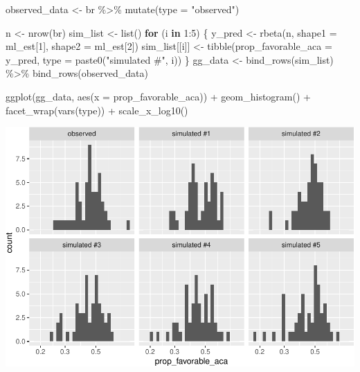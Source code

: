 \documentclass[
]{book}
\newenvironment{Shaded}{\begin{snugshade}}{\end{snugshade}}
\newcommand{\AttributeTok}[1]{\textcolor[rgb]{0.77,0.63,0.00}{#1}}
\newcommand{\ControlFlowTok}[1]{\textcolor[rgb]{0.13,0.29,0.53}{\textbf{#1}}}
\newcommand{\DecValTok}[1]{\textcolor[rgb]{0.00,0.00,0.81}{#1}}
\newcommand{\FunctionTok}[1]{\textcolor[rgb]{0.00,0.00,0.00}{#1}}
\newcommand{\NormalTok}[1]{#1}
\newcommand{\OtherTok}[1]{\textcolor[rgb]{0.56,0.35,0.01}{#1}}
\newcommand{\SpecialCharTok}[1]{\textcolor[rgb]{0.00,0.00,0.00}{#1}}
\newcommand{\StringTok}[1]{\textcolor[rgb]{0.31,0.60,0.02}{#1}}
\begin{document}
\begin{Shaded}
\begin{Highlighting}[]
\NormalTok{observed\_data }\OtherTok{\textless{}{-}}\NormalTok{ br }\SpecialCharTok{\%\textgreater{}\%}
  \FunctionTok{mutate}\NormalTok{(}\AttributeTok{type =} \StringTok{"observed"}\NormalTok{)}

\NormalTok{n }\OtherTok{\textless{}{-}} \FunctionTok{nrow}\NormalTok{(br)}
\NormalTok{sim\_list }\OtherTok{\textless{}{-}} \FunctionTok{list}\NormalTok{()}
\ControlFlowTok{for}\NormalTok{ (i }\ControlFlowTok{in} \DecValTok{1}\SpecialCharTok{:}\DecValTok{5}\NormalTok{) \{}
\NormalTok{  y\_pred }\OtherTok{\textless{}{-}} \FunctionTok{rbeta}\NormalTok{(n, }\AttributeTok{shape1 =}\NormalTok{ ml\_est[}\DecValTok{1}\NormalTok{], }\AttributeTok{shape2 =}\NormalTok{ ml\_est[}\DecValTok{2}\NormalTok{])}
\NormalTok{  sim\_list[[i]] }\OtherTok{\textless{}{-}} \FunctionTok{tibble}\NormalTok{(}\AttributeTok{prop\_favorable\_aca =}\NormalTok{ y\_pred, }
                          \AttributeTok{type =} \FunctionTok{paste0}\NormalTok{(}\StringTok{"simulated \#"}\NormalTok{, i))}
\NormalTok{\}}
\NormalTok{gg\_data }\OtherTok{\textless{}{-}} \FunctionTok{bind\_rows}\NormalTok{(sim\_list) }\SpecialCharTok{\%\textgreater{}\%}
  \FunctionTok{bind\_rows}\NormalTok{(observed\_data) }

\FunctionTok{ggplot}\NormalTok{(gg\_data, }\FunctionTok{aes}\NormalTok{(}\AttributeTok{x =}\NormalTok{ prop\_favorable\_aca)) }\SpecialCharTok{+} 
  \FunctionTok{geom\_histogram}\NormalTok{() }\SpecialCharTok{+} 
  \FunctionTok{facet\_wrap}\NormalTok{(}\FunctionTok{vars}\NormalTok{(type)) }\SpecialCharTok{+} 
  \FunctionTok{scale\_x\_log10}\NormalTok{()}
\end{Highlighting}
\end{Shaded}

\includegraphics{01-05-predictive-distribution_files/figure-latex/unnamed-chunk-9-1.pdf}
\end{document}
